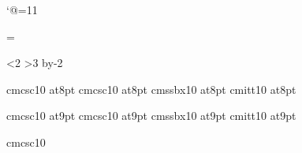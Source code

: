 

%


\catcode`@=11

\let\protect=\relax

%
%

%
%

\newif\iflucida
\newif\ifbasiccm
\newcount\fontscheme

\ifx\fonts\undefined\else\fontscheme=\fonts\fi

\ifnum\fontscheme<2 \lucidatrue\else\lucidafalse\fi
\ifnum\fontscheme>3 \basiccmtrue \advance\fontscheme by-2 \else\basiccmfalse\fi

%
%
%
% 


\def\fontsubst#1#2{\expandafter\def\csname subst@#1\endcsname{#2}}

\ifbasiccm
  \fontsubst{cmcsc8}{cmcsc10 at8pt}
  \fontsubst{cmcsci8}{cmcsc10 at8pt}
  \fontsubst{cmssbx8}{cmssbx10 at8pt}
  \fontsubst{cmitt8}{cmitt10 at8pt}

  \fontsubst{cmcsc9}{cmcsc10 at9pt}
  \fontsubst{cmcsci9}{cmcsc10 at9pt}
  \fontsubst{cmssbx9}{cmssbx10 at9pt}
  \fontsubst{cmitt9}{cmitt10 at9pt}

  \fontsubst{cmcsci10}{cmcsc10}

